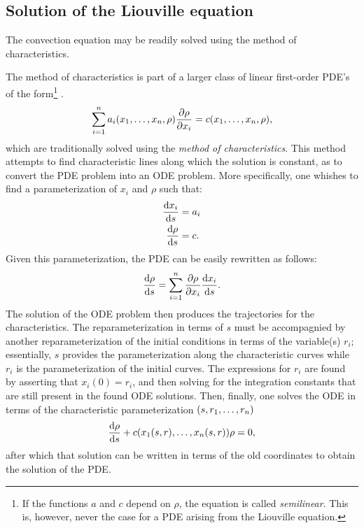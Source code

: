 \subsection{Solution of the Liouville equation}
\label{ssec:ho_liouville_solution}
The convection equation may be readily solved using the method of characteristics.
\begin{aside}{The method of characteristics}
     is part of a larger class of linear first-order PDE's of the form\footnote{If the functions $a$ and $c$ depend on $\rho$, the equation is called \emph{semilinear}. This is, however, never the case for a PDE arising from the Liouville equation.} \cite[p. 207]{Farlow1989}. \begin{equation} \sum_{i=1}^n a_i(x_1, \ldots, x_n, \rho) \pdv{\rho}{x_i} = c(x_1, \ldots, x_n, \rho), \label{eq:fo_pde}\end{equation}
    which are traditionally solved using the \emph{method of characteristics}. This method attempts to find characteristic lines along which the solution is constant, as to convert the PDE problem into an ODE problem. More specifically, one whishes to find a parameterization of $x_i$ and $\rho$ such that:
    \begin{equation}
        \begin{split}
            \dv{x_i}{s} &= a_i\\
            \dv{\rho}{s} &= c.
        \end{split}
    \end{equation}
    Given this parameterization, the PDE can be easily rewritten as follows: \cite{Farlow1989}
    $$ \dv{\rho}{s} = \sum_{i = 1}^n \pdv{\rho}{x_i}\dv{x_i}{s}. $$
    The solution of the ODE problem then produces the trajectories for the characteristics. The reparameterization in terms of $s$ must be accompagnied by another reparameterization of the initial conditions in terms of the variable(s) $r_i$; essentially, $s$ provides the parameterization along the characteristic curves while $r_i$ is the parameterization of the initial curves. The expressions for $r_i$ are found by asserting that $x_i(0) = r_i$, and then solving for the integration constants that are still present in the found ODE solutions. Then, finally, one solves the ODE in terms of the characteristic parameterization $\qty(s, r_1, \ldots, r_n)$
    $$ \dv{\rho}{s} + c\qty(x_1(s, r), \ldots, x_n(s, r))\rho = 0, $$
    after which that solution can be written in terms of the old coordinates to obtain the solution of the PDE.
    \tcblower

\end{aside}
